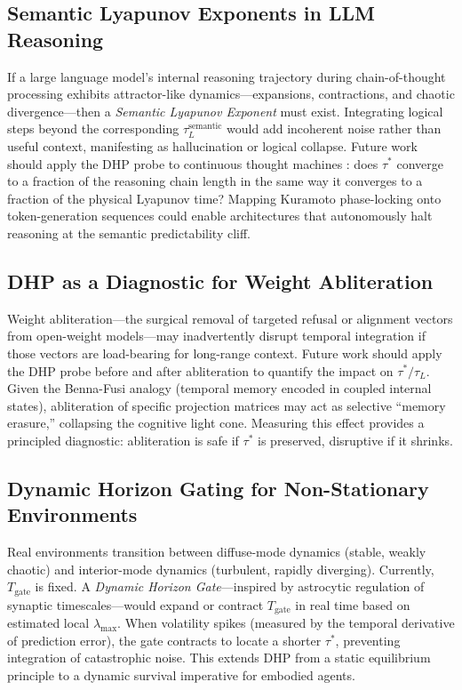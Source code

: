 \documentclass[12pt]{article}
\theoremstyle{definition}
\begin{document}
\subsection{Semantic Lyapunov Exponents in LLM Reasoning}

If a large language model's internal reasoning trajectory during chain-of-thought
processing exhibits attractor-like dynamics---expansions, contractions, and chaotic
divergence---then a \emph{Semantic Lyapunov Exponent} must exist. Integrating
logical steps beyond the corresponding $\tau_L^{\text{semantic}}$ would add
incoherent noise rather than useful context, manifesting as hallucination or logical
collapse. Future work should apply the DHP probe to continuous thought machines
\citep{yu2026ctmai}: does $\tau^*$ converge to a fraction of the reasoning chain
length in the same way it converges to a fraction of the physical Lyapunov time?
Mapping Kuramoto phase-locking onto token-generation sequences could enable
architectures that autonomously halt reasoning at the semantic predictability cliff.

\subsection{DHP as a Diagnostic for Weight Abliteration}

Weight abliteration---the surgical removal of targeted refusal or alignment vectors
from open-weight models---may inadvertently disrupt temporal integration if those
vectors are load-bearing for long-range context. Future work should apply the DHP
probe before and after abliteration to quantify the impact on $\tau^*/\tau_L$.
Given the Benna-Fusi analogy (temporal memory encoded in coupled internal states),
abliteration of specific projection matrices may act as selective ``memory erasure,''
collapsing the cognitive light cone. Measuring this effect provides a principled
diagnostic: abliteration is safe if $\tau^*$ is preserved, disruptive if it shrinks.

\subsection{Dynamic Horizon Gating for Non-Stationary Environments}

Real environments transition between diffuse-mode dynamics (stable, weakly chaotic)
and interior-mode dynamics (turbulent, rapidly diverging). Currently, $T_{\text{gate}}$
is fixed. A \emph{Dynamic Horizon Gate}---inspired by astrocytic regulation of
synaptic timescales---would expand or contract $T_{\text{gate}}$ in real time based
on estimated local $\lambda_{\max}$. When volatility spikes (measured by the temporal
derivative of prediction error), the gate contracts to locate a shorter $\tau^*$,
preventing integration of catastrophic noise. This extends DHP from a static
equilibrium principle to a dynamic survival imperative for embodied agents.
\end{document}
